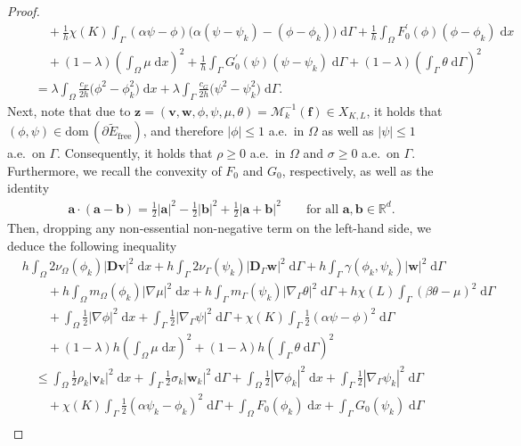 \documentclass[11pt,reqno]{amsart}
\theoremstyle{remark}
\numberwithin{equation}{section}
\newcommand{\abs}[1]{|#1|}
\newcommand{\R}{\mathbb R}
\newcommand{\intO}{\int_\Omega}
\newcommand{\intG}{\int_\Gamma}
\newcommand{\dx}{\;\mathrm{d}x}
\newcommand{\dG}{\;\mathrm d\Ga}
\newcommand{\Grad}{\nabla}
\newcommand{\Gradg}{\nabla_\Ga}
\newcommand{\Om}{\Omega}
\newcommand{\Ga}{\Gamma}
\newcommand{\bv}{\mathbf v}
\newcommand{\bw}{\mathbf w}
\newcommand{\D}{\mathbf D}
\newcommand{\Dg}{\mathbf D_\Ga}
\newcommand{\free}{\mathrm{free}}
\begin{document}
\begin{proof}
\begin{align*}
    &\qquad + \frac1h\chi(K)\intG (\alpha\psi - \phi)\big(\alpha(\psi-\psi_k) - (\phi-\phi_k)\big)\dG + \frac1h\intO F_0^\prime(\phi)(\phi-\phi_k)\dx \nonumber \\
    &\qquad + (1-\lambda)\left(\intO\mu\dx\right)^2 + \frac1h\intG G_0^\prime(\psi)(\psi-\psi_k)\dG + (1-\lambda)\left(\intG\theta\dG\right)^2 \nonumber \\
    &\quad = \lambda \intO\frac{c_F}{2h} \big(\phi^2-\phi_k^2\big)\dx + \lambda\intG \frac{c_G}{2h}\big(\psi^2-\psi_k^2\big)\dG. \nonumber
\end{align*}
Next, note that due to $\mathbf{z} = (\bv,\bw,\phi,\psi,\mu,\theta) = \mathcal{M}_k^{-1}(\mathbf{f})\in X_{K,L}$, it holds that $(\phi,\psi)\in\mathrm{dom}\,(\partial \widetilde E_\free)$, and therefore $\abs{\phi}\leq 1$ a.e.~in $\Om$ as well as $\abs{\psi}\leq 1$ a.e.~on $\Ga$. Consequently, it holds that $\rho\geq 0$ a.e.~in $\Om$ and $\sigma\geq 0 $ a.e.~on $\Ga$. Furthermore, we recall the convexity of $F_0$ and $G_0$, respectively, as well as the identity
\begin{align*}
	\mathbf{a}\cdot(\mathbf{a} - \mathbf{b}) = \frac12\abs{\mathbf{a}}^2 - \frac12\abs{\mathbf{b}}^2 + \frac12\abs{\mathbf{a}+\mathbf{b}}^2 \qquad\text{for all~}\mathbf{a},\mathbf{b}\in\R^d.
\end{align*} 
Then, dropping any non-essential non-negative term on the left-hand side, we deduce the following inequality
\begin{align}
    &h\intO 2\nu_\Om(\phi_k)\abs{\D\bv}^2\dx + h\intG 2\nu_\Ga(\psi_k)\abs{\Dg\bw}^2\dG + h\intG \gamma(\phi_k,\psi_k)\abs{\bw}^2\dG \nonumber \\
    &\qquad + h\intO m_\Om(\phi_k)\abs{\Grad\mu}^2\dx + h\intG m_\Ga(\psi_k)\abs{\Gradg\theta}^2\dG + h\chi(L)\intG (\beta\theta-\mu)^2\dG \nonumber \\
    &\qquad + \intO \frac12\abs{\Grad\phi}^2\dx + \intG \frac12\abs{\Gradg\psi}^2\dG + \chi(K)\intG \frac12 (\alpha\psi-\phi)^2\dG \nonumber \\
    &\qquad + (1-\lambda)h\left(\intO\mu\dx\right)^2 + (1-\lambda)h\left(\intG\theta\dG\right)^2 \nonumber \\
    &\quad\leq \intO \frac12 \rho_k\abs{\bv_k}^2\dx + \intG \frac12\sigma_k\abs{\bw_k}^2\dG + \intO \frac12\abs{\Grad\phi_k}^2\dx + \intG \frac12\abs{\Gradg\psi_k}^2\dG \nonumber \\
    &\qquad + \chi(K)\intG \frac12(\alpha\psi_k-\phi_k)^2\dG + \intO F_0(\phi_k)\dx + \intG G_0(\psi_k)\dG \nonumber \\

\end{align}
\end{proof}
\end{document}

